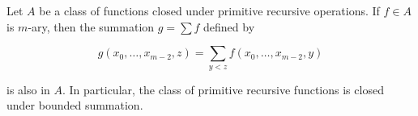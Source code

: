 Let $A$ be a class of functions closed under primitive recursive operations. If $f \in A$ is $m$-ary, then the summation $g = \sum f$ defined by

$$g(x_0, \ldots, x_{m-2}, z) = \sum_{y < z} f(x_0, \ldots, x_{m-2}, y)$$

is also in $A$. In particular, the class of primitive recursive functions is closed under bounded summation.
